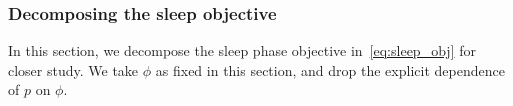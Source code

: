 


\subsubsection{Decomposing the sleep objective}
\label{sec:sleep_details}
In this section, we decompose the sleep phase objective in~\eqref{eq:sleep_obj} for closer study. 
We take $\phi$ as fixed in this section, and drop the explicit dependence of $p$ on $\phi$.

